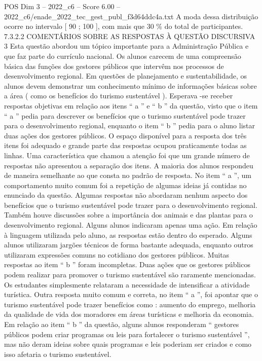 \begin{textsample}{POS Dim 3 – 2022\_c6 – Score 6.00 – 2022\_c6/enade\_2022\_tec\_gest\_publ\_f3d64ddc4a.txt}
A moda dessa distribuição ocorre no intervalo [ 90 ; 100 ], com mais que 30 \% do total de participantes. 7.3.2.2 COMENTÁRIOS SOBRE AS RESPOSTAS À QUESTÃO DISCURSIVA 3 Esta questão abordou um tópico importante para a Administração Pública e que faz parte do currículo nacional.
Os alunos carecem de uma compreensão básica das funções dos gestores públicos que intervêm nos processos de desenvolvimento regional.
Em questões de planejamento e sustentabilidade, os alunos devem demonstrar um conhecimento mínimo de informações básicas sobre a área ( como os benefícios do turismo sustentável ).
Esperava -se receber respostas objetivas em relação aos itens “ a ” e “ b ” da questão, visto que o item “ a ” pedia para descrever os benefícios que o turismo sustentável pode trazer para o desenvolvimento regional, enquanto o item “ b ” pedia para o aluno listar duas ações dos gestores públicos.
O espaço disponível para a resposta dos três itens foi adequado e grande parte das respostas ocupou praticamente todas as linhas.
Uma característica que chamou a atenção foi que um grande número de respostas não apresentou a separação dos itens.
A maioria dos alunos respondeu de maneira semelhante ao que consta no padrão de resposta.
No item “ a ”, um comportamento muito comum foi a repetição de algumas ideias já contidas no enunciado da questão.
Algumas respostas não abordaram nenhum aspecto dos benefícios que o turismo sustentável pode trazer para o desenvolvimento regional.
Também houve discussões sobre a importância dos animais e das plantas para o desenvolvimento regional.
Alguns alunos indicaram apenas uma ação.
Em relação à linguagem utilizada pelo aluno, as respostas estão dentro do esperado.
Alguns alunos utilizaram jargões técnicos de forma bastante adequada, enquanto outros utilizaram expressões comuns no cotidiano dos gestores públicos.
Muitas respostas ao item “ b ” foram incompletas.
Duas ações que os gestores públicos podem realizar para promover o turismo sustentável são raramente mencionadas.
Os estudantes simplesmente relataram a necessidade de intensificar a atividade turística.
Outra resposta muito comum e correta, no item “ a ”, foi apontar que o turismo sustentável pode trazer benefícios como : aumento do emprego, melhoria da qualidade de vida dos moradores em áreas turísticas e melhoria da economia.
Em relação ao item “ b ” da questão, alguns alunos responderam “ gestores públicos podem criar programas ou leis para fortalecer o turismo sustentável ”, mas não deram ideias sobre quais programas e leis poderiam ser criados e como isso afetaria o turismo sustentável.

\end{textsample}
